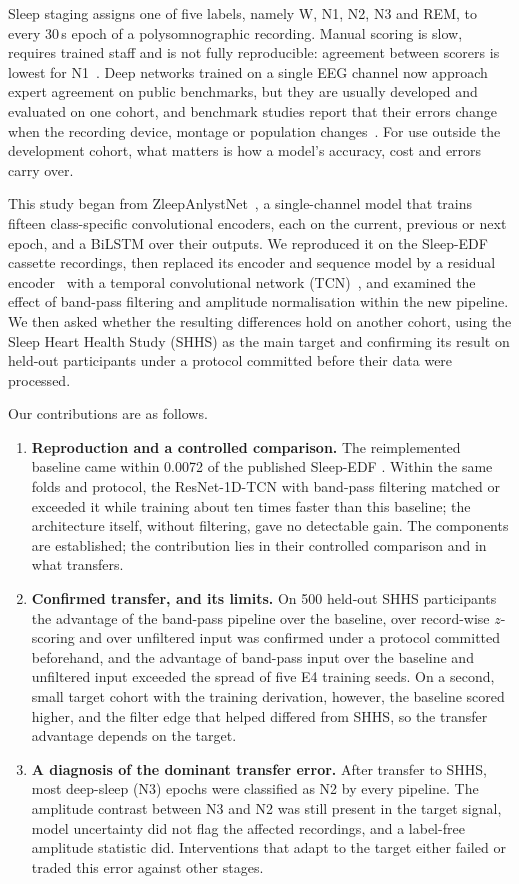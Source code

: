 \documentclass[11pt,a4paper]{article}
\newcommand{\mf}{\text{macro-F1}}
\begin{document}
Sleep staging assigns one of five labels, namely W, N1, N2, N3 and REM, to every 30\,s epoch of a
polysomnographic recording. Manual scoring is slow, requires trained staff and is not fully
reproducible: agreement between scorers is lowest for N1~\cite{rosenberg2013aasm}. Deep networks
trained on a single EEG channel now approach expert agreement on public benchmarks, but they are
usually developed and evaluated on one cohort, and benchmark studies report that their errors change
when the recording device, montage or population changes~\cite{deirossi2025sleepyland}. For use
outside the development cohort, what matters is how a model's accuracy, cost and errors carry over.

This study began from ZleepAnlystNet~\cite{jadhav2024zleepanlystnet}, a single-channel model that
trains fifteen class-specific convolutional encoders, each on the current, previous or next epoch,
and a BiLSTM over their outputs. We reproduced it on the Sleep-EDF cassette recordings, then replaced
its encoder and sequence model by a residual encoder~\cite{he2016resnet} with a temporal
convolutional network (TCN)~\cite{bai2018tcn}, and examined the effect of band-pass filtering and
amplitude normalisation within the new pipeline. We then asked whether the resulting differences
hold on another cohort, using the Sleep Heart Health Study (SHHS) as the main target and confirming
its result on held-out participants under a protocol committed before their data were processed.

Our contributions are as follows.
\begin{enumerate}[label=(\arabic*)]
\item \textbf{Reproduction and a controlled comparison.} The reimplemented baseline came within 0.0072
of the published Sleep-EDF \mf. Within the same folds and protocol, the ResNet-1D-TCN with band-pass
filtering matched or exceeded it while training about ten times faster than this baseline; the
architecture itself, without filtering, gave no detectable gain. The components are established; the
contribution lies in their controlled comparison and in what transfers.
\item \textbf{Confirmed transfer, and its limits.} On 500 held-out SHHS participants the advantage of
the band-pass pipeline over the baseline, over record-wise $z$-scoring and over unfiltered input was
confirmed under a protocol committed beforehand, and the advantage of band-pass input over the
baseline and unfiltered input exceeded the spread of five E4 training seeds. On a second, small target
cohort with the training derivation, however, the baseline scored higher, and the filter edge that
helped differed from SHHS, so the transfer advantage depends on the target.
\item \textbf{A diagnosis of the dominant transfer error.} After transfer to SHHS, most deep-sleep
(N3) epochs were classified as N2 by every pipeline. The amplitude contrast between N3 and N2 was
still present in the target signal, model uncertainty did not flag the affected recordings, and a
label-free amplitude statistic did. Interventions that adapt to the target either failed or traded
this error against other stages.
\end{enumerate}
\end{document}
